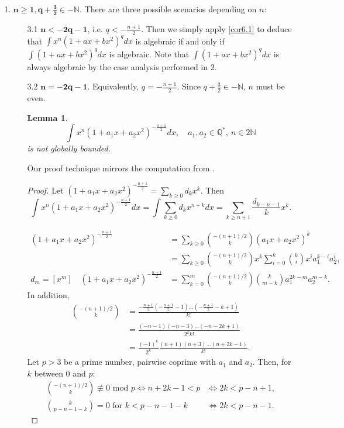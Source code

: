 \documentclass[11pt]{article}
\theoremstyle{definition}
\theoremstyle{plain}
\newtheorem{lem}[defi]{Lemma}
\theoremstyle{remark}
\begin{document}
\begin{enumerate}
\begin{proof}
By \eqref{eq:{4.4}}, 
\[\int{x^n (1+a_1x+a_2x^2)^qdx} = c\int{(1+a_1x+a_2x^2)^qdx} + \underbrace{C(x)(1+a_1x+a_2x^2)^{q+1}}_{\text{algebraic}}.\]

The corollary follows immediately from the fact that the set of algebraic functions is closed under addition.
\end{proof}

\item $\mathbf{n \geq 1, q+\frac{3}{2}\in -\mathbb{N}}$.
There are three possible scenarios depending on $n$: 
\begin{itemize}
\item[3.1] $\mathbf{n < -2q-1}$, i.e. $q < -\frac{n+1}{2}$. Then we simply apply \cref{cor6.1} to deduce that $\int{x^n (1+ax+bx^2)^qdx}$  is algebraic if and only if $\int{ (1+ax+bx^2)^qdx}$ is algebraic. Note that $\int{ (1+ax+bx^2)^qdx}$ is always algebraic by the case analysis performed in 2.
\item[3.2] $\mathbf{n = -2q-1}$. Equivalently, $q = -\frac{n+1}{2}$. Since $q+\frac{3}{2}\in -\mathbb{N}$, $n$ must be even.

\begin{lem}\label{lem:4.4}
\[\int x^n(1+a_1x+a_2x^2)^{-\frac{n+1}{2}}dx, \quad a_1,a_2 \in \mathbb{Q}^*, \ n \in 2\mathbb{N} \]
is not globally bounded.
\end{lem}
Our proof technique mirrors the computation from \cite[p.~71]{KL05}.
\begin{proof}
Let $(1+a_1x+a_2x^2)^{-\frac{n+1}{2}} = \sum\limits_{k\geq0}d_kx^k$. Then
\[\int x^n(1+a_1x+a_2x^2)^{-\frac{n+1}{2}}dx = \int \sum\limits_{k\geq0}d_kx^{n+k} dx = \sum\limits_{k\geq n+1}\frac{d_{k-n-1}}{k}x^{k}.\]

\begin{align*}
(1+a_1x+a_2x^2)^{-\frac{n+1}{2}} &= \sum\limits_{k\geq0}\binom{-(n+1)/2}{k}(a_1x+a_2x^2)^k \\&= \sum\limits_{k\geq0}\binom{-(n+1)/2}{k}x^k\sum\limits_{i=0}^{k}\binom{k}{i}x^ia_1^{k-i}a_2^i, \\
d_m = [x^m] \quad (1+a_1x+a_2x^2)^{-\frac{n+1}{2}} &= \sum\limits_{k=0}^{m}\binom{-(n+1)/2}{k} \binom{k}{m-k}a_1^{2k-m}a_2^{m-k}.
\end{align*}
In addition,
\begin{align*}
\binom{-(n+1)/2}{k} &= \frac{-\frac{n+1}{2}(-\frac{n+1}{2}-1)\ldots(-\frac{n+1}{2}-k+1)}{k!} \\ &= \frac{(-n-1)(-n-3)\ldots(-n-2k+1)}{2^kk!} \\ &= \frac{(-1)^{k}}{2^k}\frac{(n+1)(n+3)\ldots(n+2k-1)}{k!}.
\end{align*}
Let $p > 3$ be a prime number, pairwise coprime with $a_1$ and $a_2$. Then, for $k$ between 0 and $p$:
\begin{align*}
\binom{-(n+1)/2}{k} \not\equiv 0 \text{ mod } p \iff n+2k-1 < p &\iff 2k < p - n + 1,\\
\binom{k}{p-n-1-k} = 0 \text{ for } k < p-n-1-k &\iff 2k < p-n-1.
\end{align*}


\end{proof}
\end{itemize}
\end{enumerate}
\end{document}
